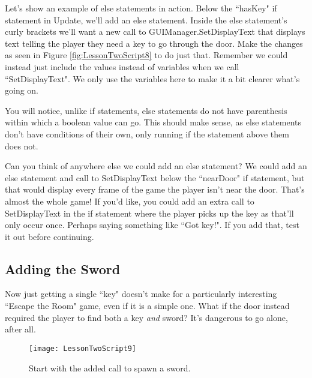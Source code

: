 \documentclass{article}
\begin{document}
Let's show an example of else statements in action. Below the ``hasKey" if statement in Update, we'll add an else statement. Inside the else statement's curly brackets we'll want a new call to GUIManager.SetDisplayText that displays text telling the player they need a key to go through the door. Make the changes as seen in Figure \ref{fig:LessonTwoScript8} to do just that. Remember we could instead just include the values instead of variables when we call ``SetDisplayText". We only use the variables here to make it a bit clearer what's going on.

You will notice, unlike if statements, else statements do not have parenthesis within which a boolean value can go. This should make sense, as else statements don't have conditions of their own, only running if the statement above them does not.

\noindent{} 

Can you think of anywhere else we could add an else statement? We could add an else statement and call to SetDisplayText below the ``nearDoor" if statement, but that would display every frame of the game the player isn't near the door. That's almost the whole game! If you'd like, you could add an extra call to SetDisplayText in the if statement where the player picks up the key as that'll only occur once. Perhaps saying something like ``Got key!". If you add that, test it out before continuing.


\subsection{Adding the Sword}

Now just getting a single ``key" doesn't make for a particularly interesting ``Escape the Room" game, even if it is a simple one. What if the door instead required the player to find both a key \textit{and} sword? It's dangerous to go alone, after all.

\begin{figure}
  \texttt{[image: LessonTwoScript9]}
  \caption{Start with the added call to spawn a sword.}
  \label{fig:LessonTwoScript9}
\end{figure}
\end{document}
